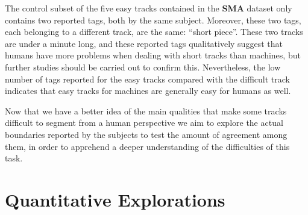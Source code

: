 \documentclass{article}
\begin{document}
The control subset of the five easy tracks contained in the \textbf{SMA} dataset only contains two reported tags, both by the same subject.
Moreover, these two tags, each belonging to a different track, are the same: ``short piece''.
These two tracks are under a minute long, and these reported tags qualitatively suggest that humans have more problems when dealing with short tracks than machines, but further studies should be carried out to confirm this.
Nevertheless, the low number of tags reported for the easy tracks compared with the difficult track indicates that easy tracks for machines are generally easy for humans as well.

Now that we have a better idea of the main qualities that make some tracks difficult to segment from a human perspective we aim to explore the actual boundaries reported by the subjects to test the amount of agreement among them, in order to apprehend a deeper understanding of the difficulties of this task.

\section{Quantitative Explorations}



\end{document}
